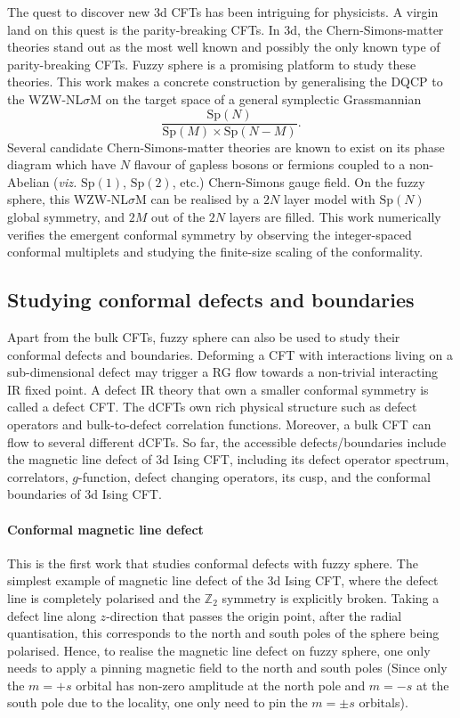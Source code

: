 \documentclass{timesjhep}
\begin{document}
The quest to discover new 3d CFTs has been intriguing for physicists. A virgin land on this quest is the parity-breaking CFTs. In 3d, the Chern-Simons-matter theories stand out as the most well known and possibly the only known type of parity-breaking CFTs. Fuzzy sphere is a promising platform to study these theories. This work makes a concrete construction by generalising the DQCP to the WZW-NL$\sigma$M on the target space of a general symplectic Grassmannian 
\begin{equation}
    \frac{\mathrm{Sp}(N)}{\mathrm{Sp}(M)\times\mathrm{Sp}(N-M)}.
\end{equation}
Several candidate Chern-Simons-matter theories are known to exist on its phase diagram which have $N$ flavour of gapless bosons or fermions coupled to a non-Abelian (\textit{viz.} $\mathrm{Sp}(1)$, $\mathrm{Sp}(2)$, etc.) Chern-Simons gauge field. On the fuzzy sphere, this WZW-NL$\sigma$M can be realised by a $2N$ layer model with $\mathrm{Sp}(N)$ global symmetry, and $2M$ out of the $2N$ layers are filled. This work numerically verifies the emergent conformal symmetry by observing the integer-spaced conformal multiplets and studying the finite-size scaling of the conformality. 

\subsection{Studying conformal defects and boundaries}

Apart from the bulk CFTs, fuzzy sphere can also be used to study their conformal defects and boundaries. Deforming a CFT with interactions living on a sub-dimensional defect may trigger a RG flow towards a non-trivial interacting IR fixed point. A defect IR theory that own a smaller conformal symmetry is called a defect CFT. The dCFTs own rich physical structure such as defect operators and bulk-to-defect correlation functions. Moreover, a bulk CFT can flow to several different dCFTs. So far, the accessible defects/boundaries include the magnetic line defect of 3d Ising CFT, including its defect operator spectrum, correlators, $g$-function, defect changing operators, its cusp, and the conformal boundaries of 3d Ising CFT. 

\paragraph{Conformal magnetic line defect~\cite{Hu2023Aug}}

This is the first work that studies conformal defects with fuzzy sphere. The simplest example of magnetic line defect of the 3d Ising CFT, where the defect line is completely polarised and the $\mathbb{Z}_2$ symmetry is explicitly broken. Taking a defect line along $z$-direction that passes the origin point, after the radial quantisation, this corresponds to the north and south poles of the sphere being polarised. Hence, to realise the magnetic line defect on fuzzy sphere, one only needs to apply a pinning magnetic field to the north and south poles (Since only the $m=+s$ orbital has non-zero amplitude at the north pole and $m=-s$ at the south pole due to the locality, one only need to pin the $m=\pm s$ orbitals). 
\end{document}
